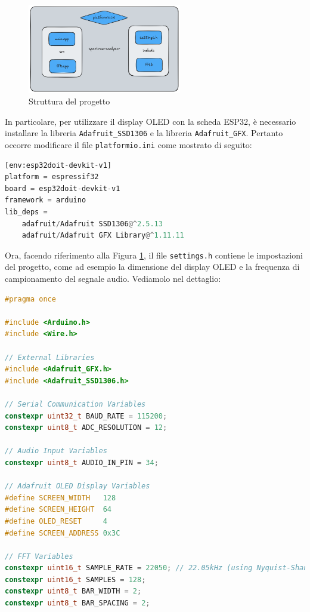 \documentclass[a4paper,12pt]{report}  %
\newcommand{\lstinlinebg}[1]{\colorbox{backcolour}{\lstinline|#1|}}
\begin{document}
\begin{figure}[h]
    \centering
    \includegraphics[width=0.6\textwidth]{imgs/project-structure.png}
    \caption{Struttura del progetto}
    \label{fig:project-structure}
\end{figure}

In particolare, per utilizzare il display OLED con la scheda ESP32, è necessario installare la libreria \lstinlinebg{Adafruit_SSD1306} e la libreria \lstinlinebg{Adafruit_GFX}.
Pertanto occorre modificare il file \lstinlinebg{platformio.ini} come mostrato di seguito:

\begin{lstlisting}[language=Python, keywords={platform, board, framework, lib_deps}]
[env:esp32doit-devkit-v1]
platform = espressif32
board = esp32doit-devkit-v1
framework = arduino
lib_deps = 
    adafruit/Adafruit SSD1306@^2.5.13
    adafruit/Adafruit GFX Library@^1.11.11
\end{lstlisting}

Ora, facendo riferimento alla Figura \ref{fig:project-structure}, il file \lstinlinebg{settings.h} contiene le impostazioni del progetto, come ad esempio la dimensione del display OLED e la frequenza di campionamento del segnale audio.
Vediamolo nel dettaglio:

\begin{lstlisting}[language=C++, keywords={constexpr, uint32_t, uint8_t, uint16_t}]
#pragma once

#include <Arduino.h>
#include <Wire.h>

// External Libraries
#include <Adafruit_GFX.h>
#include <Adafruit_SSD1306.h>

// Serial Communication Variables
constexpr uint32_t BAUD_RATE = 115200;
constexpr uint8_t ADC_RESOLUTION = 12;

// Audio Input Variables
constexpr uint8_t AUDIO_IN_PIN = 34;

// Adafruit OLED Display Variables
#define SCREEN_WIDTH   128
#define SCREEN_HEIGHT  64
#define OLED_RESET     4
#define SCREEN_ADDRESS 0x3C

// FFT Variables
constexpr uint16_t SAMPLE_RATE = 22050; // 22.05kHz (using Nyquist-Shannon Theorem)
constexpr uint16_t SAMPLES = 128;
constexpr uint8_t BAR_WIDTH = 2;
constexpr uint8_t BAR_SPACING = 2;
\end{lstlisting}
\end{document}
